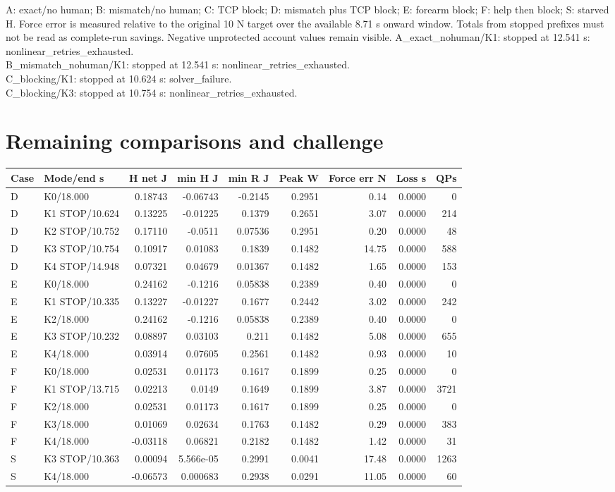 \documentclass[10pt,letterpaper]{article}
\begin{document}
A: exact/no human; B: mismatch/no human; C: TCP block; D: mismatch plus TCP block; E: forearm block; F: help then block; S: starved H. Force error is measured relative to the original 10 N target over the available 8.71 s onward window. Totals from stopped prefixes must not be read as complete-run savings. Negative unprotected account values remain visible.
A\_exact\_nohuman/K1: stopped at 12.541 s: nonlinear\_retries\_exhausted.\\
B\_mismatch\_nohuman/K1: stopped at 12.541 s: nonlinear\_retries\_exhausted.\\
C\_blocking/K1: stopped at 10.624 s: solver\_failure.\\
C\_blocking/K3: stopped at 10.754 s: nonlinear\_retries\_exhausted.\\
\clearpage\section*{Remaining comparisons and challenge}
\small\setlength{\tabcolsep}{3pt}\begin{tabular}{llrrrrrrr}\toprule Case & Mode/end s & H net J & min H J & min R J & Peak W & Force err N & Loss s & QPs\\\midrule
D & K0/18.000 & 0.18743 & -0.06743 & -0.2145 & 0.2951 & 0.14 & 0.0000 & 0 \\
D & K1 STOP/10.624 & 0.13225 & -0.01225 & 0.1379 & 0.2651 & 3.07 & 0.0000 & 214 \\
D & K2 STOP/10.752 & 0.17110 & -0.0511 & 0.07536 & 0.2951 & 0.20 & 0.0000 & 48 \\
D & K3 STOP/10.754 & 0.10917 & 0.01083 & 0.1839 & 0.1482 & 14.75 & 0.0000 & 588 \\
D & K4 STOP/14.948 & 0.07321 & 0.04679 & 0.01367 & 0.1482 & 1.65 & 0.0000 & 153 \\
E & K0/18.000 & 0.24162 & -0.1216 & 0.05838 & 0.2389 & 0.40 & 0.0000 & 0 \\
E & K1 STOP/10.335 & 0.13227 & -0.01227 & 0.1677 & 0.2442 & 3.02 & 0.0000 & 242 \\
E & K2/18.000 & 0.24162 & -0.1216 & 0.05838 & 0.2389 & 0.40 & 0.0000 & 0 \\
E & K3 STOP/10.232 & 0.08897 & 0.03103 & 0.211 & 0.1482 & 5.08 & 0.0000 & 655 \\
E & K4/18.000 & 0.03914 & 0.07605 & 0.2561 & 0.1482 & 0.93 & 0.0000 & 10 \\
F & K0/18.000 & 0.02531 & 0.01173 & 0.1617 & 0.1899 & 0.25 & 0.0000 & 0 \\
F & K1 STOP/13.715 & 0.02213 & 0.0149 & 0.1649 & 0.1899 & 3.87 & 0.0000 & 3721 \\
F & K2/18.000 & 0.02531 & 0.01173 & 0.1617 & 0.1899 & 0.25 & 0.0000 & 0 \\
F & K3/18.000 & 0.01069 & 0.02634 & 0.1763 & 0.1482 & 0.29 & 0.0000 & 383 \\
F & K4/18.000 & -0.03118 & 0.06821 & 0.2182 & 0.1482 & 1.42 & 0.0000 & 31 \\
S & K3 STOP/10.363 & 0.00094 & 5.566e-05 & 0.2991 & 0.0041 & 17.48 & 0.0000 & 1263 \\
S & K4/18.000 & -0.06573 & 0.000683 & 0.2938 & 0.0291 & 11.05 & 0.0000 & 60 \\
\bottomrule\end{tabular}\normalsize
\end{document}
